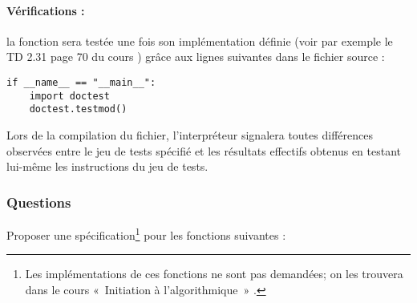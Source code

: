 \paragraph{Vérifications :} la fonction sera testée une fois son implémentation
définie (voir par exemple le TD 2.31 page 70 du cours \cite{cours}) grâce aux 
lignes suivantes dans le fichier source :
\vspace*{3mm}

\noindent\begin{minipage}{4cm}
\begin{Verbatim}
if __name__ == "__main__":
    import doctest
    doctest.testmod()
\end{Verbatim}
\end{minipage}
\hfill
\begin{minipage}{9cm}
Lors de la compilation du fichier, l'interpréteur signalera toutes
différences observées entre le jeu de tests spécifié et les résultats 
effectifs obtenus en testant lui-même les instructions du jeu de tests.
\end{minipage}

\subsubsection{Questions}
Proposer une spécification\footnote{Les implémentations de 
ces fonctions ne sont pas demandées; on les trouvera 
dans le cours «~{Initiation à l'algorithmique}~» \cite{cours}.}
 pour les fonctions suivantes :

